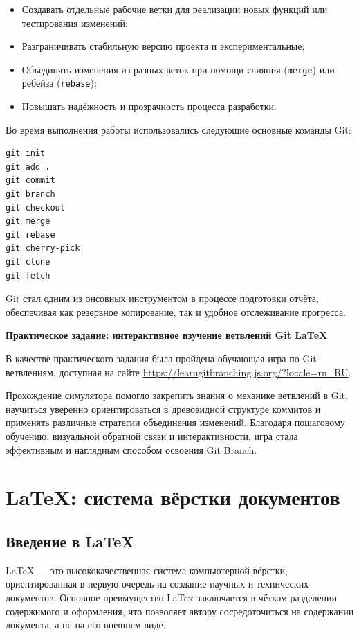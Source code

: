 \documentclass[a4paper,12pt]{report}
\begin{document}
\begin{itemize}
    \item Создавать отдельные рабочие ветки для реализации новых функций или тестирования изменений;
    \item Разграничивать стабильную версию проекта и экспериментальные;
    \item Объединять изменения из разных веток при помощи слияния (\texttt{merge}) или ребейза (\texttt{rebase});
    \item Повышать надёжность и прозрачность процесса разработки.
\end{itemize}

Во время выполнения работы использовались следующие основные команды Git:

\begin{verbatim}
git init
git add .
git commit 
git branch 
git checkout 
git merge 
git rebase
git cherry-pick
git clone
git fetch

\end{verbatim}

Git стал одним из онсовных инструментом в процессе подготовки отчёта, обеспечивая как резервное копирование, так и удобное отслеживание прогресса.


\textbf{Практическое задание: интерактивное изучение ветвлений Git LaTeX}

В качестве практического задания была пройдена обучающая игра по Git-ветвлениям, доступная на сайте \url{https://learngitbranching.js.org/?locale=ru_RU}. 

Прохождение симулятора помогло закрепить знания о механике ветвлений в Git, научиться уверенно ориентироваться в древовидной структуре коммитов и применять различные стратегии объединения изменений. Благодаря пошаговому обучению, визуальной обратной связи и интерактивности, игра стала эффективным и наглядным способом освоения Git Branch.




\chapter{LaTeX: система вёрстки документов}

\section{Введение в LaTeX}

LaTeX — это высококачественная система компьютерной вёрстки, ориентированная в первую очередь на создание научных и технических документов. Основное преимущество  LaTex заключается в чётком разделении содержимого и оформления, что позволяет автору сосредоточиться на содержании документа, а не на его внешнем виде.
\end{document}
